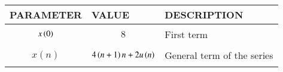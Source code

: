 \begin{tabular}{|p{2cm}|p{2.5cm}|p{2.3cm}|}
    \hline
    PARAMETER & VALUE & DESCRIPTION  \\ \hline
    $$x\left(0\right)$$ & $$8$$ & First term \\ \hline
	$$x(n)$$ & $$4\left(n+1\right){n+2}u\left(n\right)$$ & General term of the series  \\ 
    \hline
  \end{tabular}
